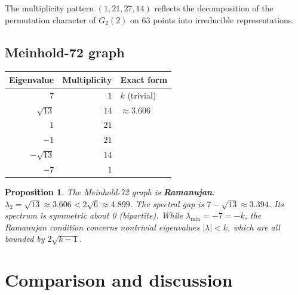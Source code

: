 \documentclass[11pt,a4paper]{article}
\theoremstyle{plain}
\newtheorem{proposition}[theorem]{Proposition}
\theoremstyle{definition}
\theoremstyle{remark}
\begin{document}
The multiplicity pattern $(1, 21, 27, 14)$ reflects the decomposition of the
permutation character of $G_2(2)$ on 63 points into irreducible representations.


\subsection{Meinhold-72 graph}

\begin{tcolorbox}[colback=black!5, colframe=black!5,
  boxrule=0pt, sharp corners]
\centering
{}
\label{tab:meinhold}
\begin{tabular}{@{}rrl@{}}
\toprule
Eigenvalue & Multiplicity & Exact form \\
\midrule
$7$           & $1$  & $k$ (trivial) \\
$\sqrt{13}$   & $14$ & $\approx 3.606$ \\
$1$           & $21$ & \\
$-1$          & $21$ & \\
$-\sqrt{13}$  & $14$ & \\
$-7$          & $1$  & \\
\bottomrule
\end{tabular}

\begin{proposition}
The Meinhold-72 graph is \textbf{Ramanujan}: $\lambda_2 = \sqrt{13} \approx 3.606 < 2\sqrt{6} \approx 4.899$. The spectral gap is $7 - \sqrt{13} \approx 3.394$.
Its spectrum is symmetric about 0 (bipartite). While $\lambda_{\min} = -7 = -k$,
the Ramanujan condition concerns nontrivial eigenvalues $|\lambda| < k$, which
are all bounded by $2\sqrt{k-1}$.
\end{proposition}
\end{tcolorbox}


\section{Comparison and discussion}
\end{document}
